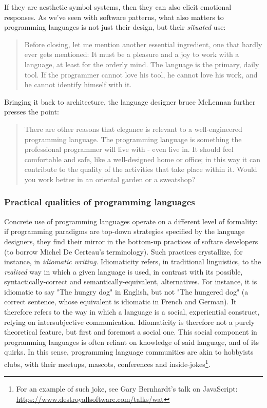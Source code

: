 If they are aesthetic symbol systems, then they can also elicit emotional responses. As we've seen with software patterns, what also matters to programming languages is not just their design, but their \emph{situated} use:

\begin{quote}
  Before closing, let me mention another essential ingredient, one that hardly ever gets mentioned: It must be a pleasure and a joy to work with a language, at least for the orderly mind. The language is the primary, daily tool. If the programmer cannot love his tool, he cannot love his work, and he cannot identify himself with it.\citep{wirth_essence_2003}
\end{quote}

Bringing it back to architecture, the language designer bruce McLennan further presses the point:

\begin{quote}
  There are other reasons that elegance is relevant to a well-engineered programming language. The programming language is something the professional programmer will live with - even live in. It should feel comfortable and safe, like a well-designed home or office; in this way it can contribute to the quality of the activities that take place within it. Would you work better in an oriental garden or a sweatshop?\citep{mclennan_who_1997}
\end{quote}

\subsubsection{Practical qualities of programming languages}
\label{subsubsec:practical-qualities-programming-languages}

Concrete use of programming languages operate on a different level of formality: if programming paradigms are top-down strategies specified by the language designers, they find their mirror in the bottom-up practices of softare developers (to borrow Michel De Certeau's terminology). Such practices crystallize, for instance, in \emph{idiomatic writing}. Idiomaticity refers, in traditional linguistics, to the \emph{realized} way in which a given language is used, in contrast with its possible, syntactically-correct and semantically-equivalent, alternatives. For instance, it is idiomatic to say "The hungry dog" in English, but not "The hungered dog" (a correct sentence, whose equivalent is idiomatic in French and German). It therefore refers to the way in which a language is a social, experiential construct, relying on intersubjective communication\citep{voloshinov_marxism_1986}. Idiomaticity is therefore not a purely theoretical feature, but first and foremost a social one. This social component in programming languages is often reliant on knowledge of said language, and of its quirks. In this sense, programming language communities are akin to hobbyists clubs, with their meetups, mascots, conferences and inside-jokes\footnote{For an example of such joke, see Gary Bernhardt's talk on JavaScript: \url{https://www.destroyallsoftware.com/talks/wat}}.

